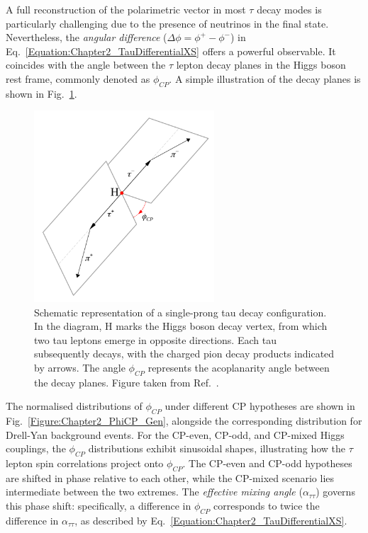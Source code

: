 A full reconstruction of the polarimetric vector in most $\tau$ decay modes is particularly challenging due to the presence of neutrinos in the final state. Nevertheless, the \textit{angular difference} ($\Delta\phi = \phi^+ - \phi^-$) in Eq.~\ref{Equation:Chapter2_TauDifferentialXS} offers a powerful observable. It coincides with the angle between the $\tau$ lepton decay planes in the Higgs boson rest frame, commonly denoted as $\phi_{CP}$. A simple illustration of the decay planes is shown in Fig.~\ref{Figure:Chapter2_DecayPlanes}.

\begin{figure}[h]
\centering
\includegraphics[width= 0.6\textwidth]{Figures/Chapter2/DecayPlane.pdf}
\caption[Schematic representation of a single-prong tau decay configuration]{Schematic representation of a single-prong tau decay configuration. In the diagram, H marks the Higgs boson decay vertex, from which two tau leptons emerge in opposite directions. Each tau subsequently decays, with the charged pion decay products indicated by arrows. The angle $\phi_{CP}$ represents the acoplanarity angle between the decay planes. Figure taken from Ref.~\cite{HiggsCP_CMS_2021}.}
\label{Figure:Chapter2_DecayPlanes}
\end{figure}

\clearpage
The normalised distributions of $\phi_{CP}$ under different CP hypotheses are shown in Fig.~\ref{Figure:Chapter2_PhiCP_Gen}, alongside the corresponding distribution for Drell-Yan background events. For the CP-even, CP-odd, and CP-mixed Higgs couplings, the $\phi_{CP}$ distributions exhibit sinusoidal shapes, illustrating how the $\tau$ lepton spin correlations project onto $\phi_{CP}$. The CP-even and CP-odd hypotheses are shifted in phase relative to each other, while the CP-mixed scenario lies intermediate between the two extremes. The \textit{effective mixing angle} ($\alpha_{\tau\tau}$) governs this phase shift: specifically, a difference in $\phi_{CP}$ corresponds to twice the difference in $\alpha_{\tau\tau}$, as described by Eq.~\ref{Equation:Chapter2_TauDifferentialXS}.

